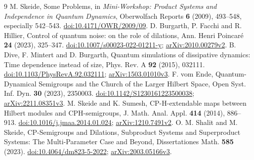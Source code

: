 \documentclass[11pt]{article}
\begin{document}
\begin{thebibliography}{9}
 M. Skeide, Some Problems, in \emph{Mini-Workshop:
Product Systems and Independence in Quantum Dynamics}, Oberwolfach
Reports \textbf{6} (2009), 493--548, especially 542--543.
\href{https://doi.org/10.4171/OWR/2009/09}{doi:10.4171/OWR/2009/09}.
 D. Burgarth, P. Facchi and R. Hillier,
Control of quantum noise: on the role of dilations,
Ann. Henri Poincar\'e \textbf{24} (2023), 325--347.
\href{https://doi.org/10.1007/s00023-022-01211-y}{doi:10.1007/s00023-022-01211-y};
\href{https://arxiv.org/abs/2010.00279v2}{arXiv:2010.00279v2}.
 B. Dive, F. Mintert and D. Burgarth,
Quantum simulations of dissipative dynamics: Time dependence instead of size,
Phys. Rev. A \textbf{92} (2015), 032111.
\href{https://doi.org/10.1103/PhysRevA.92.032111}{doi:10.1103/PhysRevA.92.032111};
\href{https://arxiv.org/abs/1503.01010v3}{arXiv:1503.01010v3}.
 F. vom Ende, Quantum-Dynamical Semigroups and the
Church of the Larger Hilbert Space, Open Syst. Inf. Dyn. \textbf{30}
(2023), 2350003.
\href{https://doi.org/10.1142/S1230161223500038}{doi:10.1142/S1230161223500038};
\href{https://arxiv.org/abs/2211.08351v3}{arXiv:2211.08351v3}.
 M. Skeide and K. Sumesh, CP-H-extendable maps between
Hilbert modules and CPH-semigroups, J. Math. Anal. Appl. \textbf{414}
(2014), 886--913.
\href{https://doi.org/10.1016/j.jmaa.2014.01.024}{doi:10.1016/j.jmaa.2014.01.024};
\href{https://arxiv.org/abs/1210.7491v2}{arXiv:1210.7491v2}.
 O. M. Shalit and M. Skeide, CP-Semigroups and
Dilations, Subproduct Systems and Superproduct Systems: The Multi-Parameter
Case and Beyond, Dissertationes Math. \textbf{585} (2023).
\href{https://doi.org/10.4064/dm823-5-2022}{doi:10.4064/dm823-5-2022};
\href{https://arxiv.org/abs/2003.05166v3}{arXiv:2003.05166v3}.
\end{thebibliography}
\end{document}
